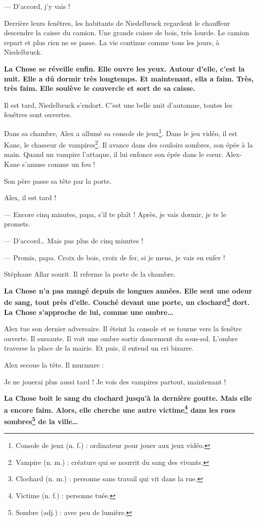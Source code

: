 --- D'accord, j'y vais ! \fg{}

Derrière leurs fenêtres, les habitants de Niedelbruck regardent le chauffeur descendre la caisse du camion. Une grande
caisse de bois, très lourde. Le camion repart et plus rien ne se passe. La vie continue comme tous les jours, à
Niedelbruck.

\textbf{La Chose se réveille enfin. Elle ouvre les yeux. Autour d'elle, c'est la nuit. Elle a dû dormir très longtemps. Et
maintenant, ella a faim. Très, très faim. Elle soulève le couvercle et sort de sa caisse.}

Il est tard, Niedelbruck s'endort. C'est une belle nuit d'automne, toutes les fenêtres sont ouvertes.

Dans sa chambre, Alex a allumé sa console de jeux\footnote{Console de jeux (n. f.) : ordinateur pour jouer aux jeux
vidéo.}. Dans le jeu vidéo, il est Kane, le chasseur de vampires\footnote{Vampire (n. m.) : créature qui se nourrit du
sang des vivants.}. Il avance dans des couloirs sombres, son épée à la main. Quand un vampire l'attaque, il lui enfonce
son épée dans le c\oe{}ur. Alex-Kane s'amuse comme un fou !

Son père passe sa tête par la porte.

\og Alex, il est tard !

--- Encore cinq minutes, papa, s'il te plaît ! Après, je vais dormir, je te le promets.

--- D'accord\ldots{} Mais pas plus de cinq minutes !

--- Promis, papa. Croix de bois, croix de fer, si je mens, je vais en enfer ! \fg{}

Stéphane Allar sourit. Il referme la porte de la chambre.

\textbf{La Chose n'a pas mangé depuis de longues années. Elle sent une odeur de sang, tout près d'elle. Couché devant une porte,
un clochard\footnote{Clochard (n. m.) : personne sans travail qui vit dans la rue.} dort. La Chose s'approche de lui,
comme une ombre\ldots{}}

Alex tue son dernier adversaire. Il éteint la console et se tourne vers la fenêtre ouverte. Il sursaute. Il voit une
ombre sortir doucement du sous-sol. L'ombre traverse la place de la mairie. Et puis, il entend un cri bizarre.

Alex secoue la tête. Il murmure :

\og Je ne jouerai plus aussi tard ! Je vois des vampires partout, maintenant ! \fg{}

\textbf{La Chose boit le sang du clochard jusqu'à la dernière goutte. Mais elle a encore faim. Alors, elle cherche une autre
victime\footnote{Victime (n. f.) : personne tuée.} dans les rues sombres\footnote{Sombre (adj.) : avec peu de lumière.}
de la ville\ldots{}}
